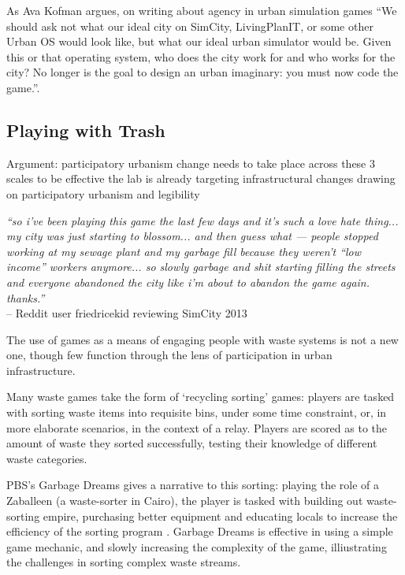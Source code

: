 \documentclass[nofonts,nols,justified,nobib]{tufte-book}
\begin{document}
As Ava Kofman argues, on writing about agency in urban simulation games ``We should ask not what our ideal city on SimCity, LivingPlanIT, or some other Urban OS would look like, but what our ideal urban simulator would be. Given this or that operating system, who does the city work for and who works for the city? No longer is the goal to design an urban imaginary: you must now code the game.''.


\subsection*{Playing with Trash}
Argument:
participatory urbanism 
change needs to take place across these 3 scales to be effective
the lab is already targeting infrastructural changes
drawing on participatory urbanism and legibility

\begin{flushright}
\emph{``so i've been playing this game the last few days and it's such a love hate thing... my city was just starting to blossom... and then guess what --- people stopped working at my sewage plant and my garbage fill because they weren't ``low income'' workers anymore... so slowly garbage and shit starting filling the streets and everyone abandoned the city like i'm about to abandon the game again. thanks.''}\cite{friedricekid_is_2017}\\
-- Reddit user friedricekid reviewing SimCity 2013
\end{flushright}

The use of games as a means of engaging people with waste systems is not a new one, though few function through the lens of participation in urban infrastructure. 

Many waste games take the form of `recycling sorting' games: players are tasked with sorting waste items into requisite bins, under some time constraint, or, in more elaborate scenarios, in the context of a relay. Players are scored as to the amount of waste they sorted successfully, testing their knowledge of different waste categories. 

PBS's Garbage Dreams gives a narrative to this sorting: playing the role of a Zaballeen (a waste-sorter in Cairo), the player is tasked with building out waste-sorting empire, purchasing better equipment and educating locals to increase the efficiency of the sorting program \cite{iskander_garbage_2011}. Garbage Dreams is effective in using a simple game mechanic, and slowly increasing the complexity of the game, illiustrating the challenges in sorting complex waste streams. 
\end{document}
